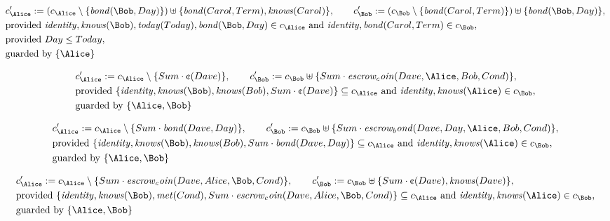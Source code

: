 \begin{align*}
&
c'_
{
\Alice
}
 := 
(c_
{
\Alice
}
 \setminus 
\{
\mathit{
bond
}
(
\Bob
,
Day
)
\}
) \uplus 
\{
\mathit{
bond
}
(
Carol
,
Term
)
,
\mathit{
knows
}
(
Carol
)
\}
, \qquad 
c'_
{
\Bob
}
 := 
(c_
{
\Bob
}
 \setminus 
\{
\mathit{
bond
}
(
Carol
,
Term
)
\}
) \uplus 
\{
\mathit{
bond
}
(
\Bob
,
Day
)
\}
,\\
&
\text{provided } 
\mathit{
identity
}
,
\mathit{
knows
}
(
\Bob
)
,
\mathit{
today
}
(
Today
)
,
\mathit{
bond
}
(
\Bob
,
Day
)
 \in c_
{
\Alice
}
 \text{ and } 
\mathit{
identity
}
,
\mathit{
bond
}
(
Carol
,
Term
)
 \in c_
{
\Bob
}
,\\
&
\text{provided } 
Day
\le
Today
,\\
&
\text{guarded by } \{
\Alice
\}
\end{align*}

\begin{align*}
&
c'_
{
\Alice
}
 := 
c_
{
\Alice
}
 \setminus 
\{
Sum
\cdot
\text{\textcent}
(
Dave
)
\}
, \qquad 
c'_
{
\Bob
}
 := 
c_
{
\Bob
}
 \uplus 
\{
Sum
\cdot
\mathit{
escrow_coin
}
(
Dave
,
\Alice
,
Bob
,
Cond
)
\}
,\\
&
\text{provided } 
\{
\mathit{
identity
}
,
\mathit{
knows
}
(
\Bob
)
,
\mathit{
knows
}
(
Bob
)
,
Sum
\cdot
\text{\textcent}
(
Dave
)
\}
 \subseteq c_
{
\Alice
}
 \text{ and } 
\mathit{
identity
}
,
\mathit{
knows
}
(
\Alice
)
 \in c_
{
\Bob
}
,\\
&
\text{guarded by } \{
\Alice
,
\Bob
\}
\end{align*}

\begin{align*}
&
c'_
{
\Alice
}
 := 
c_
{
\Alice
}
 \setminus 
\{
Sum
\cdot
\mathit{
bond
}
(
Dave
,
Day
)
\}
, \qquad 
c'_
{
\Bob
}
 := 
c_
{
\Bob
}
 \uplus 
\{
Sum
\cdot
\mathit{
escrow_bond
}
(
Dave
,
Day
,
\Alice
,
Bob
,
Cond
)
\}
,\\
&
\text{provided } 
\{
\mathit{
identity
}
,
\mathit{
knows
}
(
\Bob
)
,
\mathit{
knows
}
(
Bob
)
,
Sum
\cdot
\mathit{
bond
}
(
Dave
,
Day
)
\}
 \subseteq c_
{
\Alice
}
 \text{ and } 
\mathit{
identity
}
,
\mathit{
knows
}
(
\Alice
)
 \in c_
{
\Bob
}
,\\
&
\text{guarded by } \{
\Alice
,
\Bob
\}
\end{align*}

\begin{align*}
&
c'_
{
\Alice
}
 := 
c_
{
\Alice
}
 \setminus 
\{
Sum
\cdot
\mathit{
escrow_coin
}
(
Dave
,
Alice
,
\Bob
,
Cond
)
\}
, \qquad 
c'_
{
\Bob
}
 := 
c_
{
\Bob
}
 \uplus 
\{
Sum
\cdot
\text{\textcent}
(
Dave
)
,
\mathit{
knows
}
(
Dave
)
\}
,\\
&
\text{provided } 
\{
\mathit{
identity
}
,
\mathit{
knows
}
(
\Bob
)
,
\mathit{
met
}
(
Cond
)
,
Sum
\cdot
\mathit{
escrow_coin
}
(
Dave
,
Alice
,
\Bob
,
Cond
)
\}
 \subseteq c_
{
\Alice
}
 \text{ and } 
\mathit{
identity
}
,
\mathit{
knows
}
(
\Alice
)
 \in c_
{
\Bob
}
,\\
&
\text{guarded by } \{
\Alice
,
\Bob
\}
\end{align*}
